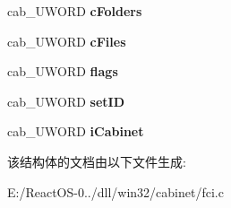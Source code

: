 \begin{DoxyCompactItemize}
cab\+\_\+\+U\+W\+O\+RD {\bfseries c\+Folders}
\item 
\mbox{\label{struct_c_f_h_e_a_d_e_r_af6cc116949281fc86d78407b3f2b12ba}} 
cab\+\_\+\+U\+W\+O\+RD {\bfseries c\+Files}
\item 
\mbox{\label{struct_c_f_h_e_a_d_e_r_a5602c4fca76398726250847d04009b8b}} 
cab\+\_\+\+U\+W\+O\+RD {\bfseries flags}
\item 
\mbox{\label{struct_c_f_h_e_a_d_e_r_af79493c3aba237243156b474e24b5720}} 
cab\+\_\+\+U\+W\+O\+RD {\bfseries set\+ID}
\item 
\mbox{\label{struct_c_f_h_e_a_d_e_r_af832a5a2b739824c90ec21b0d6438957}} 
cab\+\_\+\+U\+W\+O\+RD {\bfseries i\+Cabinet}
\end{DoxyCompactItemize}


该结构体的文档由以下文件生成\+:\begin{DoxyCompactItemize}
\item 
E\+:/\+React\+O\+S-\/0../dll/win32/cabinet/fci.\+c\end{DoxyCompactItemize}
